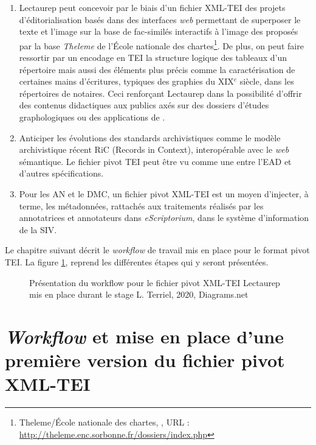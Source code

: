 \begin{enumerate}
    \item Lectaurep peut concevoir par le biais d'un fichier XML-TEI des projets d'éditorialisation basés dans des interfaces \textit{web} permettant de superposer le texte et l'image sur la base de fac-similés interactifs à l'image des  proposés par la base \textit{Theleme} de l'École nationale des chartes\footnote{Theleme/École nationale des chartes, , URL : \url{http://theleme.enc.sorbonne.fr/dossiers/index.php}}.
    De plus, on peut faire ressortir par un encodage en TEI la structure logique des tableaux d'un répertoire mais aussi des éléments plus précis comme la caractérisation de certaines mains d'écritures, typiques des graphies du XIX$^{e}$ siècle, dans les répertoires de notaires. Ceci renforçant Lectaurep dans la possibilité d'offrir des contenus didactiques aux publics axés sur des dossiers d'études graphologiques ou des applications de . 
    \item Anticiper les évolutions des standards archivistiques comme le modèle archivistique récent RiC (Records in Context), interopérable avec le \textit{web} sémantique. Le fichier pivot TEI peut être vu comme une  entre l'EAD et d'autres spécifications.
    \item Pour les AN et le DMC, un fichier pivot XML-TEI est un moyen d'injecter, à terme, les métadonnées, rattachés aux traitements réalisés par les annotatrices et annotateurs dans \textit{eScriptorium}, dans le système d'information de la SIV. 
\end{enumerate}
\bigskip
Le chapitre suivant décrit le \textit{workflow} de travail mis en place pour le format pivot TEI. La figure \ref{fig:workflow_tei_pivot_lectaurep}, reprend les différentes étapes qui y seront présentées.
\begin{figure}
    \centering
    \centerline{}
    \caption{Présentation du workflow pour le fichier pivot XML-TEI Lectaurep mis en place durant le stage  \textcopyright L. Terriel, 2020, Diagrams.net}
    \label{fig:workflow_tei_pivot_lectaurep}
\end{figure}
\clearpage
\thispagestyle{empty}

\chapter{\textit{Workflow} et mise en place d'une première version du fichier pivot XML-TEI}
